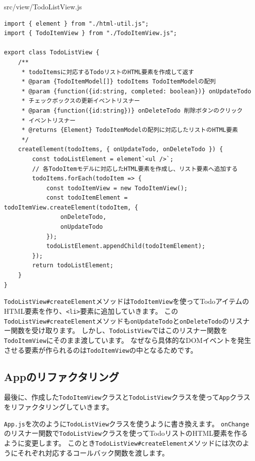\begin{listtitle}
src/view/TodoListView.js
\end{listtitle}
\begin{lstlisting}
import { element } from "./html-util.js";
import { TodoItemView } from "./TodoItemView.js";

export class TodoListView {
    /**
     * todoItemsに対応するTodoリストのHTML要素を作成して返す
     * @param {TodoItemModel[]} todoItems TodoItemModelの配列
     * @param {function({id:string, completed: boolean})} onUpdateTodo 
     * チェックボックスの更新イベントリスナー
     * @param {function({id:string})} onDeleteTodo 削除ボタンのクリック
     * イベントリスナー
     * @returns {Element} TodoItemModelの配列に対応したリストのHTML要素
     */
    createElement(todoItems, { onUpdateTodo, onDeleteTodo }) {
        const todoListElement = element`<ul />`;
        // 各TodoItemモデルに対応したHTML要素を作成し、リスト要素へ追加する
        todoItems.forEach(todoItem => {
            const todoItemView = new TodoItemView();
            const todoItemElement = todoItemView.createElement(todoItem, {
                onDeleteTodo,
                onUpdateTodo
            });
            todoListElement.appendChild(todoItemElement);
        });
        return todoListElement;
    }
}
\end{lstlisting}
\listend

\texttt{TodoListView\#createElement}メソッドは\texttt{TodoItemView}を使ってTodoアイテムのHTML要素を作り、\texttt{<li>}要素に追加していきます。
この\texttt{TodoListView\#createElement}メソッドも\texttt{onUpdateTodo}と\texttt{onDeleteTodo}のリスナー関数を受け取ります。
しかし、\texttt{TodoListView}ではこのリスナー関数を\texttt{TodoItemView}にそのまま渡しています。
なぜなら具体的なDOMイベントを発生させる要素が作られるのは\texttt{TodoItemView}の中となるためです。

\hypertarget{app-refactoring}{%
\subsection{Appのリファクタリング}\label{app-refactoring}}

最後に、作成した\texttt{TodoItemView}クラスと\texttt{TodoListView}クラスを使って\texttt{App}クラスをリファクタリングしていきます。

\texttt{App.js}を次のように\texttt{TodoListView}クラスを使うように書き換えます。
\texttt{onChange}のリスナー関数で\texttt{TodoListView}クラスを使ってTodoリストのHTML要素を作るように変更します。
このとき\texttt{TodoListView\#createElement}メソッドには次のようにそれぞれ対応するコールバック関数を渡します。

